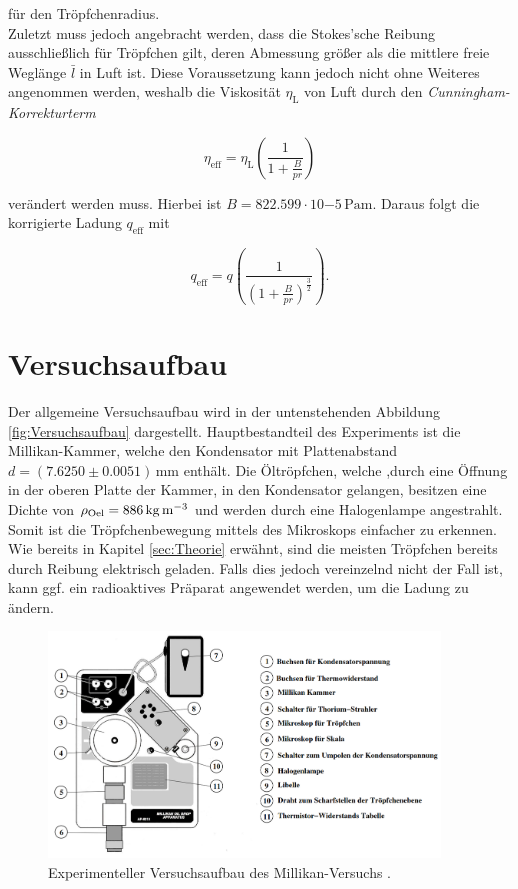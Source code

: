 \noindent für den Tröpfchenradius.\\

\noindent Zuletzt muss jedoch angebracht werden, dass die Stokes'sche Reibung ausschließlich für Tröpfchen gilt, deren Abmessung
größer als die mittlere freie Weglänge $\bar{l}$ in Luft ist. Diese Voraussetzung kann jedoch nicht ohne Weiteres
angenommen werden, weshalb die Viskosität $\eta_\text{L}$ von Luft durch den \emph{Cunningham-Korrekturterm} 

\begin{equation*}
    \eta_\text{eff} = \eta_\text{L}\left(\frac{1}{1 + \frac{B}{pr}}\right)
\end{equation*}

\noindent verändert werden muss. Hierbei ist $B = 822.599\cdot{}10{-5}\,\unit{\pascal\meter}$. Daraus folgt die korrigierte 
Ladung $q_\text{eff}$ mit 

\begin{equation}
\label{eqn:cunningLad}
    q_\text{eff} = q\left(\frac{1}{\left(1+\frac{B}{pr}\right)^{\frac{3}{2}}}\right).
\end{equation}

\section{Versuchsaufbau}
\label{sec:Versuchsaufbau}

\noindent Der allgemeine Versuchsaufbau wird in der untenstehenden Abbildung \ref{fig:Versuchsaufbau} dargestellt. Hauptbestandteil des Experiments
ist die Millikan-Kammer, welche den Kondensator mit Plattenabstand $d = \left(7.6250\pm0.0051\right)
\,\unit{\milli\meter}$ enthält. Die Öltröpfchen, welche ,durch eine Öffnung in der oberen Platte der Kammer,
in den Kondensator gelangen, besitzen eine Dichte von $\rho_\text{Oel}= 886\,\unit[per-mode=reciprocal]{\kilo\gram\per\cubic\meter}$ und 
werden durch eine Halogenlampe angestrahlt. Somit ist die Tröpfchenbewegung mittels des Mikroskops einfacher zu erkennen. Wie bereits 
in Kapitel \ref{sec:Theorie} erwähnt, sind die meisten Tröpfchen bereits durch Reibung elektrisch geladen. Falls dies 
jedoch vereinzelnd nicht der Fall ist, kann ggf. ein radioaktives Präparat angewendet werden, um die Ladung zu ändern.

\begin{figure}
    \centering 
    \includegraphics[height=6cm]{Aufbau.png}
    \caption{Experimenteller Versuchsaufbau des Millikan-Versuchs \cite{Versuchsanleitung_v503}.}
    \label{fig:Aufbau}
\end{figure}

